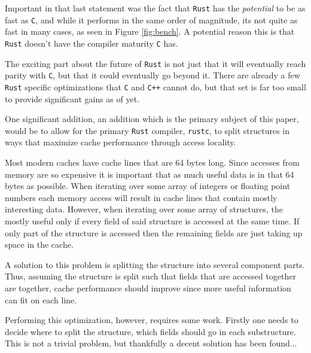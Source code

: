 \documentclass[12pt,final]{article}
\newcommand{\rustname}{{\texttt{Rust}}}
\def \rust {\rustname{}\xspace}
\newcommand{\rustcname}{{\texttt{rustc}}}
\def \rustc {\rustcname{}\xspace}
\newcommand{\cname}{{\texttt{C}}}
\def \c {\cname{}\xspace}
\newcommand{\cppname}{{\texttt{C++}}}
\def \cpp {\cppname{}\xspace}
\begin{document}
Important in that last statement was the fact that \rust has the \textit{potential}
to be as fast as \c, and while it performs in the same order of magnitude, its not
quite as fast in many cases, as seen in Figure \ref{fig:bench}.
A potential reason this is that \rust doesn't have the compiler maturity \c has.

The exciting part about the future of \rust is not just that it will eventually
reach parity with \c, but that it could eventually go beyond it. There are
already a few \rust specific optimizations that \c and \cpp cannot do, but that
set is far too small to provide significant gains as of yet.


One significant addition, an addition which is the primary subject of this
paper, would be to allow for the primary \rust compiler, \rustc, to split
structures in ways that maximize cache performance through access locality.

Most modern caches have cache lines that are 64 bytes long. Since accesses from
memory are so expensive it is important that as much useful data is in that 64
bytes as possible. When iterating over some array of integers or floating point
numbers each memory access will result in cache lines that contain mostly
interesting data. However, when iterating over some array of structures,
the mostly useful only
if every field of said structure is accessed at the same time. If only part of
the structure is accessed then the remaining fields are just taking up space in
the cache.

A solution to this problem is splitting the structure into several component
parts. Thus, assuming the structure is split such that fields that are accessed
together are together, cache performance should improve since more useful 
information can fit on each line.

Performing this optimization, however, requires some work. Firstly one
needs to decide where to split the structure, which fields should go in
each substructure. This is not a trivial problem, but thankfully a decent
solution has been found...

\end{document}
